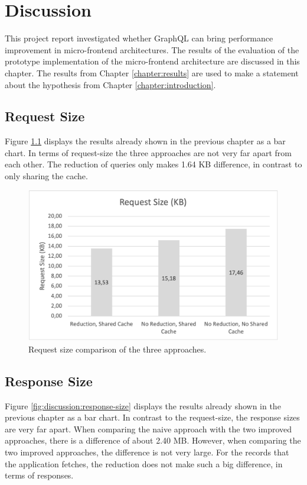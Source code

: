 \chapter{Discussion}\label{chapter:discussion}

This project report investigated whether GraphQL can bring performance improvement in micro-frontend architectures. The results of the evaluation of the prototype implementation of the micro-frontend architecture are discussed in this chapter. The results from Chapter \ref{chapter:results} are used to make a statement about the hypothesis from Chapter \ref{chapter:introduction}.

\section{Request Size}

Figure \ref{fig:discussion:request-size} displays the results already shown in the previous chapter as a bar chart. In terms of request-size the three approaches are not very far apart from each other. The reduction of queries only makes 1.64 KB difference, in contrast to only sharing the cache.

\ifshowImages
\begin{figure}[H]
\centering
\includegraphics[width=0.8\linewidth]{images/discussion/request-size.png}
\caption{Request size comparison of the three approaches.}\label{fig:discussion:request-size}
\end{figure}
\fi

\section{Response Size}

Figure \ref{fig:discussion:response-size} displays the results already shown in the previous chapter as a bar chart. In contrast to the request-size, the response sizes are very far apart. When comparing the naive approach with the two improved approaches, there is a difference of about 2.40 MB. However, when comparing the two improved approaches, the difference is not very large. For the records that the application fetches, the reduction does not make such a big difference, in terms of responses.

